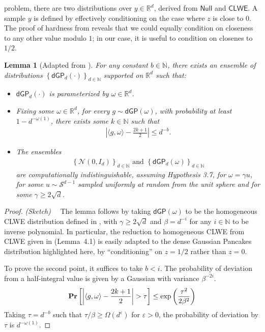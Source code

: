 \documentclass[preprint,11pt]{elsarticle}
\newtheorem{lemma}[theorem]{Lemma}
\newcommand{\R}{\mathbb{R}} %
\newcommand{\Nbb}{\mathbb{N}}
\newcommand{\Rbb}{\mathbb{R}}
\newcommand{\CLWE}{\mathsf{CLWE}}
\newcommand{\Normal}{\mathcal{N}}
\newcommand{\set}[1] {\left\{ #1 \right\}}
\renewcommand{\Pr}{\textnormal{\bf Pr}}
\newcommand{\card}[1] {\left\vert #1 \right\vert}
\newcommand{\lr}[1]{\left[#1\right]}
\newcommand{\eps}{\varepsilon}
\newcommand{\dGP}{\mathsf{dGP}}
\begin{document}
\noindent problem, there are two distributions over $y \in \R^d$, derived from $\mathsf{Null}$ and $\CLWE$.
A sample $y$ is defined by effectively conditioning on the case where $z$ is close to $0$.
The proof of hardness from \cite{BST21} reveals that we could equally condition on closeness to any other value modulo $1$; in our case, it is useful to condition on closenes to $1/2$.
\begin{lemma}[Adapted from \cite{BST21}]
\label{lem:dgp}
For any constant $b \in \Nbb$, there exists an ensemble of distributions $\set{\dGP_d(\cdot)}_{d \in \Nbb}$ supported on $\Rbb^d$ such that:
\begin{itemize}
\item $\dGP_d(\cdot)$ is parameterized by $\omega \in \Rbb^d$.
\item Fixing some $\omega \in \Rbb^d$, for every $g \sim \dGP(\omega)$, with probability at least $1-d^{-\omega(1)}$, there exists some $k \in \Nbb$ such that
\begin{gather*}
    \card{\langle g, \omega \rangle - \frac{2k+1}{2}} \le d^{-b}.
\end{gather*}
\item The ensembles
\begin{gather*}
    \set{\Normal(0,I_d)}_{d \in \Nbb} \textrm{ and } \set{\dGP_d(\omega)}_{d \in \Nbb}
\end{gather*}
are computationally indistinguishable, assuming Hypothesis 3.7, for $\omega = \gamma u$, for some $u \sim \mathcal{S}^{d-1}$ sampled uniformly at random from the unit sphere and for some $\gamma \ge 2\sqrt{d}$.
\end{itemize}
\end{lemma}
\begin{proof} \emph{(Sketch)}~~
The lemma follows by taking $\dGP(\omega)$ to be the homogeneous CLWE distribution defined in \cite{BST21}, with $\gamma \ge 2 \sqrt{d}$ and $\beta = d^{-i}$ for any $i \in \Nbb$ to be inverse polynomial.
In particular, the reduction to homogeneous CLWE from CLWE given in \cite{BST21} (Lemma~4.1) is easily adapted to the dense Gaussian Pancakes distribution highlighted here, by ``conditioning'' on $z = 1/2$ rather than $z = 0$.

To prove the second point, it suffices to take $b < i$.
The probability of deviation from a half-integral value is given by a Gaussian with variance $\beta^{-2i}$.
\begin{gather*}
    \Pr\lr{\card{\langle g, \omega \rangle - \frac{2k+1}{2}} > \tau } \le \exp\left(\frac{\tau^2}{2 \beta^2}\right)
\end{gather*}
Taking $\tau = d^{-b}$ such that $\tau/\beta \ge \Omega(d^{\eps})$ for $\eps > 0$, the probability of deviation by $\tau$ is $d^{-\omega(1)}$.
\end{proof}
\end{document}

